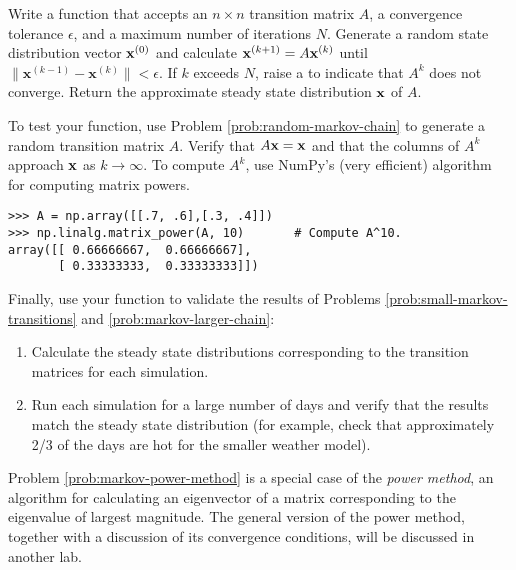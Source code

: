 \begin{problem} %
Write a function that accepts an $n\times n$ transition matrix $A$, a convergence tolerance $\epsilon$, and a maximum number of iterations $N$.
Generate a random state distribution vector $\mathbf{x}^{(0)}$ and calculate $\mathbf{x}^{(k+1)} = A\mathbf{x}^{(k)}$ until $\|\mathbf{x}^{(k-1)} - \mathbf{x}^{(k)}\| < \epsilon$.
If $k$ exceeds $N$, raise a  to indicate that $A^k$ does not converge.
Return the approximate steady state distribution $\mathbf{x}$ of $A$.

To test your function, use Problem \ref{prob:random-markov-chain} to generate a random transition matrix $A$.
Verify that $A\mathbf{x} = \mathbf{x}$ and that the columns of $A^k$ approach $\mathbf{x}$ as $k\rightarrow\infty$.
To compute $A^k$, use NumPy's (very efficient) algorithm for computing matrix powers. %

\begin{lstlisting}
>>> A = np.array([[.7, .6],[.3, .4]])
>>> np.linalg.matrix_power(A, 10)       # Compute A^10.
array([[ 0.66666667,  0.66666667],
       [ 0.33333333,  0.33333333]])
\end{lstlisting}

Finally, use your function to validate the results of Problems \ref{prob:small-markov-transitions} and \ref{prob:markov-larger-chain}:
\begin{enumerate}
    \item Calculate the steady state distributions corresponding to the transition matrices for each simulation.
    \item Run each simulation for a large number of days and verify that the results match the steady state distribution (for example, check that approximately 2/3 of the days are hot for the smaller weather model).
\end{enumerate}

\label{prob:markov-power-method}
\end{problem}

\begin{info}
Problem \ref{prob:markov-power-method} is a special case of the \emph{power method}, an algorithm for calculating an eigenvector of a matrix corresponding to the eigenvalue of largest magnitude.
The general version of the power method, together with a discussion of its convergence conditions, will be discussed in another lab.
\end{info}

